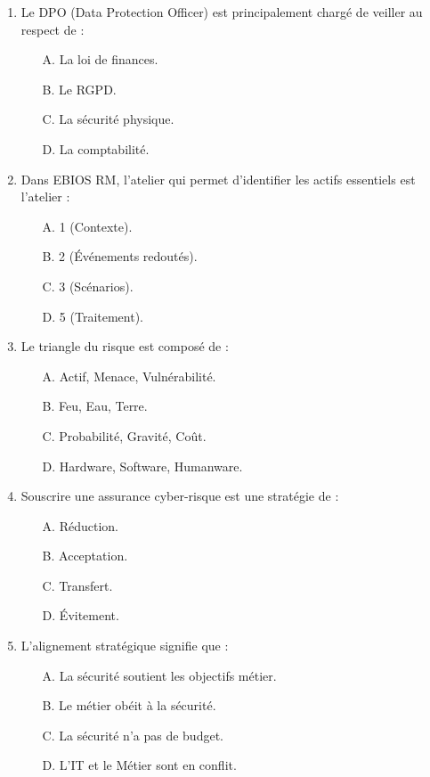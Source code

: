\begin{enumerate}
    \item Le DPO (Data Protection Officer) est principalement chargé de veiller au respect de :
    \begin{itemize}
        \item[A.] La loi de finances.
        \item[B.] Le RGPD.
        \item[C.] La sécurité physique.
        \item[D.] La comptabilité.
    \end{itemize}

    \item Dans EBIOS RM, l'atelier qui permet d'identifier les actifs essentiels est l'atelier :
    \begin{itemize}
        \item[A.] 1 (Contexte).
        \item[B.] 2 (Événements redoutés).
        \item[C.] 3 (Scénarios).
        \item[D.] 5 (Traitement).
    \end{itemize}

    \item Le triangle du risque est composé de :
    \begin{itemize}
        \item[A.] Actif, Menace, Vulnérabilité.
        \item[B.] Feu, Eau, Terre.
        \item[C.] Probabilité, Gravité, Coût.
        \item[D.] Hardware, Software, Humanware.
    \end{itemize}

    \item Souscrire une assurance cyber-risque est une stratégie de :
    \begin{itemize}
        \item[A.] Réduction.
        \item[B.] Acceptation.
        \item[C.] Transfert.
        \item[D.] Évitement.
    \end{itemize}

    \item L'alignement stratégique signifie que :
    \begin{itemize}
        \item[A.] La sécurité soutient les objectifs métier.
        \item[B.] Le métier obéit à la sécurité.
        \item[C.] La sécurité n'a pas de budget.
        \item[D.] L'IT et le Métier sont en conflit.
    \end{itemize}


\end{enumerate}

